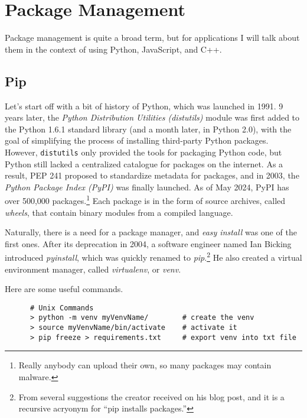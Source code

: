 \section{Package Management} 

  Package management is quite a broad term, but for applications I will talk about them in the context of using Python, JavaScript, and C++. 

\subsection{Pip} 

  Let's start off with a bit of history of Python, which was launched in 1991. 9 years later, the \textit{Python Distribution Utilities (distutils)} module was first added to the Python 1.6.1 standard library (and a month later, in Python 2.0), with the goal of simplifying the process of installing third-party Python packages. However, \texttt{distutils} only provided the tools for packaging Python code, but Python still lacked a centralized catalogue for packages on the internet. As a result, PEP 241 proposed to standardize metadata for packages, and in 2003, the \textit{Python Package Index (PyPI)} was finally launched. As of May 2024, PyPI has over 500,000 packages.\footnote{Really anybody can upload their own, so many packages may contain malware.} Each package is in the form of source archives, called \textit{wheels}, that contain binary modules from a compiled language. 

  Naturally, there is a need for a package manager, and \textit{easy install} was one of the first ones. After its deprecation in 2004, a software engineer named Ian Bicking introduced \textit{pyinstall}, which was quickly renamed to \textit{pip}.\footnote{From several suggestions the creator received on his blog post, and it is a recursive acryonym for ``pip installs packages.''} He also created a virtual environment manager, called \textit{virtualenv}, or \textit{venv}. 

  \begin{example}
    Here are some useful commands. 
    \begin{lstlisting}
      # Unix Commands
      > python -m venv myVenvName/        # create the venv
      > source myVenvName/bin/activate    # activate it  
      > pip freeze > requirements.txt     # export venv into txt file 
    \end{lstlisting}
  \end{example}

